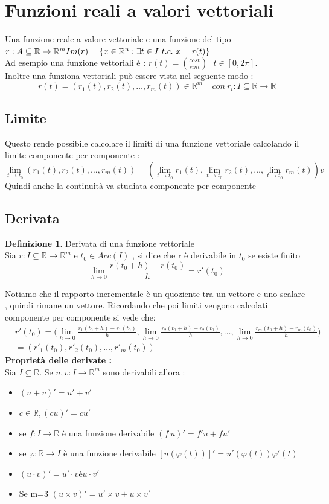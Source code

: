 \documentclass{article}
\theoremstyle{definition}
\newtheorem*{definizione}{Definizione}
\newcommand{\R}{\mathbb{R}}
\newcommand{\Rn}{\R^n}
\begin{document}
	\section{Funzioni reali a valori vettoriali }
	Una funzione reale a valore vettoriale e una funzione del tipo $r: A \subseteq \R \rightarrow \R^m \\Im(r)=\{x\in \Rn : \exists t \in I \ t.c. \ x=r(t)\} $ \\
	Ad esempio una funzione vettoriali è : $r(t)=\binom{cost}{sint} \ \ \ t\in [0,2\pi]$.\\
	Inoltre una funziona vettoriali può essere vista nel seguente modo : 
	$$r(t)=(r_1(t),r_2(t),\dots,r_m(t)) \in \R^m \ \ \ \ \ con \ r_i: I\subseteq \R \rightarrow \R$$
	\subsection{Limite}
	Questo rende possibile calcolare il limiti di una funzione vettoriale calcolando il limite componente per componente : 
	$$\lim_{t\rightarrow t_0}(r_1(t),r_2(t),\dots,r_m(t))=(\lim_{t\rightarrow t_0} r_1(t) , \lim_{t\rightarrow t_0}r_2(t),\dots , \lim_{t\rightarrow t_0}r_m(t) ) v$$
	Quindi anche la continuità va studiata componente per componente
	\subsection{Derivata}
	\begin{definizione}
		Derivata di una funzione vettoriale\\
		Sia $r:I\subseteq \R \rightarrow \R^m$ e $t_0 \in Acc(I)$ , si dice che r è derivabile in $t_0$ se esiste finito 
		$$\lim_{h\rightarrow 0}\frac{r(t_0+h)-r(t_0)}{h}=r'(t_0)$$
	\end{definizione}
	Notiamo che il rapporto incrementale è un quoziente tra un vettore e uno scalare , quindi rimane un vettore. Ricordando che poi limiti vengono calcolati componente per componente si vede che: 
	\begin{align*}
		&r'(t_0)= \biggl( \lim_{h\rightarrow 0}\frac{r_1(t_0+h)-r_1(t_0)}{h} , \lim_{h\rightarrow 0}\frac{r_2(t_0+h)-r_2(t_0)}{h},\dots,\lim_{h\rightarrow 0}\frac{r_m(t_0+h)-r_m(t_0)}{h}\biggr)\\
		&=(r'_1(t_0),r'_2(t_0),\dots,r'_m(t_0))
	\end{align*}
	\textbf{Proprietà delle derivate :  }\\
	Sia $I\subseteq \R$. Se $u,v : I \rightarrow \R^m$ sono derivabili allora : 
	\begin{itemize}
		\item $(u+v)'=u'+v'$
		\item $c\in \R , (cu)'=cu'$
		\item se $f:I\rightarrow \R$ è una funzione derivabile $(f\ u)'=f'u+fu'$
		\item se $\varphi :  \R \rightarrow I$ è una funzione derivabile $[u(\varphi(t))]'=u'(\varphi(t))\varphi'(t) $
		\item $(u\cdot v)' = u'\cdot v \text{è} u \cdot v'$
		\item Se m=3 $(u\times v)'=u'\times v + u \times v'$
	\end{itemize}
\end{document}
